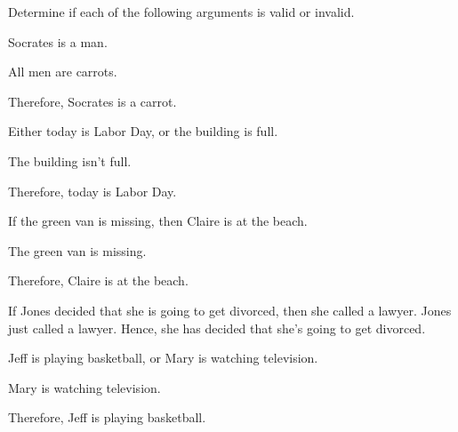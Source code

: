 
\practiceproblems
\problempart
Determine if each of the following arguments is valid or invalid.

\begin{enumerate}[(1)] %
\item 
\begin{earg}
\item Socrates is a man.
\item All men are carrots.
\item Therefore, Socrates is a carrot.
\end{earg}

\item
\begin{earg}
\item Either today is Labor Day, or the building is full.
\item The building isn’t full.
\item Therefore, today is Labor Day.
\end{earg}
\smallskip

\noindent\begin{minipage}{0.99\textwidth}
\item
\begin{earg}
\item If the green van is missing, then Claire is at the beach.
\item The green van is missing.
\item Therefore, Claire is at the beach.
\end{earg}
\end{minipage}
\smallskip

\item\begin{earg}
\item[] If Jones decided that she is going to get divorced, then she called a lawyer. Jones just called a lawyer. Hence, she has decided that she’s going to get divorced. 
\end{earg}

\item\begin{earg}
\item Jeff is playing basketball, or Mary is watching television.
\item Mary is watching television.
\item Therefore, Jeff is playing basketball.
\end{earg}


\end{enumerate}
